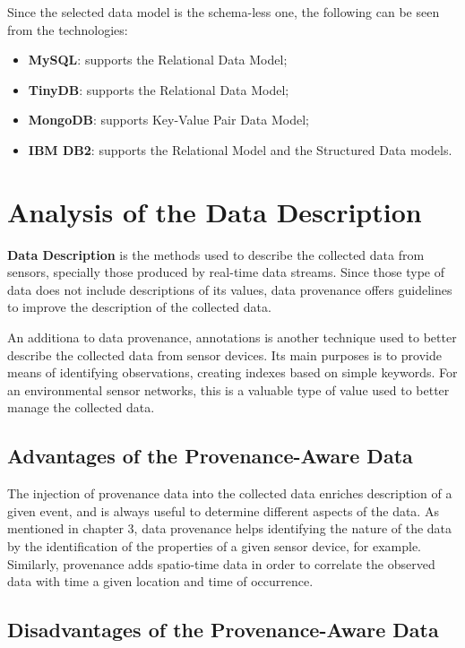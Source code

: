 Since the selected data model is the schema-less one, the following can be seen
from the technologies:

\begin{itemize}
  \item \textbf{MySQL}: supports the Relational Data Model;
  \item \textbf{TinyDB}: supports the Relational Data Model; 
  \item \textbf{MongoDB}: supports Key-Value Pair Data Model;
  \item \textbf{IBM DB2}: supports the Relational Model and the Structured
  Data models.
\end{itemize}

\section{Analysis of the Data Description}

\textbf{Data Description} is the methods used to describe the collected data
from sensors, specially those produced by real-time data streams. Since those
type of data does not include descriptions of its values, data provenance
offers guidelines to improve the description of the collected data.

An additiona to data provenance, annotations is another technique used to
better describe the collected data from sensor devices. Its main purposes is to
provide means of identifying observations, creating indexes based on simple
keywords. For an environmental sensor networks, this is a valuable type of value
used to better manage the collected data.

\subsection{Advantages of the Provenance-Aware Data}

The injection of provenance data into the collected data enriches description
of a given event, and is always useful to determine different aspects of the
data. As mentioned in chapter 3, data provenance helps identifying the nature
of the data by the identification of the properties of a given sensor device,
for example. Similarly, provenance adds spatio-time data in order to correlate
the observed data with time a given location and time of occurrence.

\subsection{Disadvantages of the Provenance-Aware Data}

